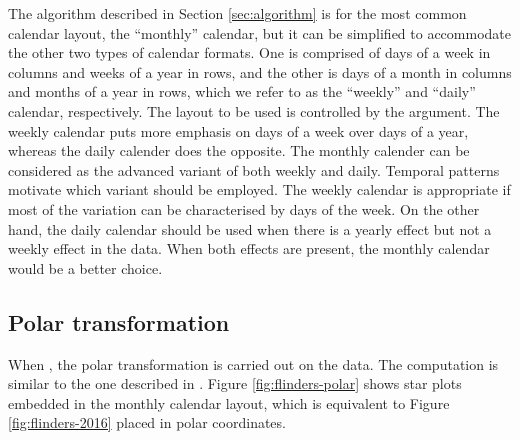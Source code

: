 \documentclass[article]{jss}
\theoremstyle{definition}
\theoremstyle{definition}
\theoremstyle{remark}
\begin{document}
The algorithm described in Section \ref{sec:algorithm} is for the most
common calendar layout, the ``monthly'' calendar, but it can be
simplified to accommodate the other two types of calendar formats. One
is comprised of days of a week in columns and weeks of a year in rows,
and the other is days of a month in columns and months of a year in
rows, which we refer to as the ``weekly'' and ``daily'' calendar,
respectively. The layout to be used is controlled by the 
argument. The weekly calendar puts more emphasis on days of a week over
days of a year, whereas the daily calender does the opposite. The
monthly calender can be considered as the advanced variant of both
weekly and daily. Temporal patterns motivate which variant should be
employed. The weekly calendar is appropriate if most of the variation
can be characterised by days of the week. On the other hand, the daily
calendar should be used when there is a yearly effect but not a weekly
effect in the data. When both effects are present, the monthly calendar
would be a better choice.

\subsection{Polar transformation}\label{polar-transformation}

When , the polar transformation is carried out on the
data. The computation is similar to the one described in
\citet{Wickham2012glyph}. Figure \ref{fig:flinders-polar} shows star
plots embedded in the monthly calendar layout, which is equivalent to
Figure \ref{fig:flinders-2016} placed in polar coordinates.
\end{document}
